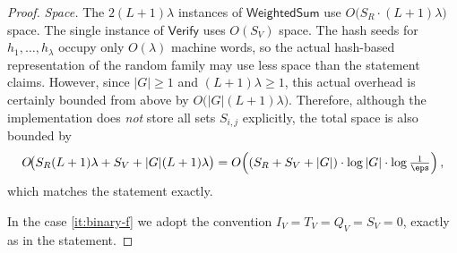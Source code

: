 \begin{proof}
\emph{Space.}
The $2(L+1)\lambda$ instances of $\mathsf{WeightedSum}$ use
$O\!\bigl(S_R\cdot (L+1)\lambda\bigr)$ space.
The single instance of $\mathsf{Verify}$ uses $O(S_V)$ space.
The hash seeds for $h_1,\dots,h_\lambda$ occupy only $O(\lambda)$ machine
words, so the actual hash-based representation of the random family may use
less space than the statement claims.
However, since $|G|\ge 1$ and $(L+1)\lambda\ge 1$, this actual overhead is
certainly bounded from above by $O\!\bigl(|G|(L+1)\lambda\bigr)$.
Therefore, although the implementation does \emph{not} store all sets
$S_{i,j}$ explicitly, the total space is also bounded by
\[
O\!\bigl(S_R(L+1)\lambda + S_V + |G|(L+1)\lambda\bigr)
=
O\!\left((S_R+S_V+|G|)\cdot \log|G|\cdot
\log\tfrac{1}{\eps}\right),
\]
which matches the statement exactly.

In the case \cref{it:binary-f} we adopt the convention
$I_V=T_V=Q_V=S_V=0$, exactly as in the statement.
\end{proof}

